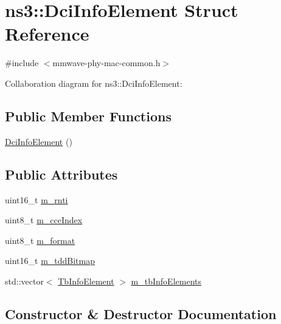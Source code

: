 \hypertarget{structns3_1_1DciInfoElement}{}\section{ns3\+:\+:Dci\+Info\+Element Struct Reference}
\label{structns3_1_1DciInfoElement}


{\ttfamily \#include $<$mmwave-\/phy-\/mac-\/common.\+h$>$}



Collaboration diagram for ns3\+:\+:Dci\+Info\+Element\+:
\subsection*{Public Member Functions}
\begin{DoxyCompactItemize}
\item 
\hyperlink{structns3_1_1DciInfoElement_a9878ef6d0857ddf08f8b2e22e72b3116}{Dci\+Info\+Element} ()
\end{DoxyCompactItemize}
\subsection*{Public Attributes}
\begin{DoxyCompactItemize}
\item 
uint16\+\_\+t \hyperlink{structns3_1_1DciInfoElement_a297dddfac0c3a31d69fefd3a970c113e}{m\+\_\+rnti}
\item 
uint8\+\_\+t \hyperlink{structns3_1_1DciInfoElement_af66650910097e03fe718afe73b37dfb5}{m\+\_\+cce\+Index}
\item 
uint8\+\_\+t \hyperlink{structns3_1_1DciInfoElement_a88cea41f9fcf43bce6145e585cbefe45}{m\+\_\+format}
\item 
uint16\+\_\+t \hyperlink{structns3_1_1DciInfoElement_afdec7f1549f30be0d4be704a30f4e156}{m\+\_\+tdd\+Bitmap}
\item 
std\+::vector$<$ \hyperlink{structns3_1_1TbInfoElement}{Tb\+Info\+Element} $>$ \hyperlink{structns3_1_1DciInfoElement_a452785081ea9e2194fb70f6b89c81b27}{m\+\_\+tb\+Info\+Elements}
\end{DoxyCompactItemize}


\subsection{Constructor \& Destructor Documentation}
